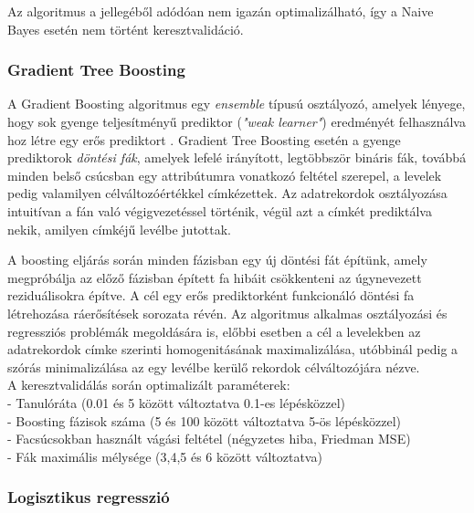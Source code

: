 \documentclass[12pt]{article}
\begin{document}
Az algoritmus a jellegéből adódóan nem igazán optimalizálható, így a Naive Bayes esetén nem történt keresztvalidáció.

\subsubsection{Gradient Tree Boosting}

A Gradient Boosting algoritmus egy \emph{ensemble} típusú osztályozó, amelyek lényege, hogy sok gyenge teljesítményű prediktor (\textit{"weak learner"}) eredményét felhasználva hoz létre egy erős prediktort \cite{friedman}. Gradient Tree Boosting esetén a gyenge prediktorok \textit{döntési fák}, amelyek lefelé irányított, legtöbbször bináris fák, továbbá minden belső csúcsban egy attribútumra vonatkozó feltétel szerepel, a levelek pedig valamilyen célváltozóértékkel címkézettek. Az adatrekordok osztályozása intuitívan a fán való végigvezetéssel történik, végül azt a címkét prediktálva nekik, amilyen címkéjű levélbe jutottak.

A boosting eljárás során minden fázisban egy új döntési fát építünk, amely megpróbálja az előző fázisban épített fa hibáit csökkenteni az úgynevezett reziduálisokra építve. A cél egy erős prediktorként funkcionáló döntési fa létrehozása ráerősítések sorozata révén. Az algoritmus alkalmas osztályozási és regressziós problémák megoldására is, előbbi esetben a cél a levelekben az adatrekordok címke szerinti homogenitásának maximalizálása, utóbbinál pedig a szórás minimalizálása az egy levélbe kerülő rekordok célváltozójára nézve. \\



\noindent A keresztvalidálás során optimalizált paraméterek: \\
- Tanulóráta (0.01 és 5 között változtatva 0.1-es lépésközzel)\\
- Boosting fázisok száma (5 és 100 között változtatva 5-ös lépésközzel)\\
- Facsúcsokban használt vágási feltétel (négyzetes hiba, Friedman MSE) \\
- Fák maximális mélysége (3,4,5 és 6 között változtatva) \\

\subsubsection{Logisztikus regresszió}
\end{document}

